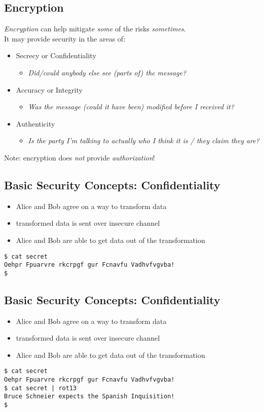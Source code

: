 \documentclass[xga]{xdvislides}
\begin{document}
\subsection{Encryption}
{\em Encryption} can help mitigate {\em some} of the risks {\em sometimes}.
\\

It may provide security in the areas of:
\begin{itemize}
	\item Secrecy or Confidentiality
		\begin{itemize}
			\item {\em Did/could anybody else see (parts of) the message?}
		\end{itemize}
	\item Accuracy or Integrity
		\begin{itemize}
			\item {\em Was the message (could it have been) modified before I received it?}
		\end{itemize}
	\item Authenticity
		\begin{itemize}
			\item {\em Is the party I'm talking to actually
who I think it is / they claim they are?}
		\end{itemize}
\end{itemize}
\vspace{.5in}
Note: encryption does {\em not} provide {\em authorization}!

\subsection{Basic Security Concepts: Confidentiality}
\begin{itemize}
	\item Alice and Bob agree on a way to transform data
	\item transformed data is sent over insecure channel
	\item Alice and Bob are able to get data out of the transformation
\end{itemize}
\addvspace{.5in}
\begin{verbatim}
$ cat secret
Oehpr Fpuarvre rkcrpgf gur Fcnavfu Vadhvfvgvba!
$
\end{verbatim}

\subsection{Basic Security Concepts: Confidentiality}
\begin{itemize}
	\item Alice and Bob agree on a way to transform data
	\item transformed data is sent over insecure channel
	\item Alice and Bob are able to get data out of the transformation
\end{itemize}
\addvspace{.5in}
\begin{verbatim}
$ cat secret
Oehpr Fpuarvre rkcrpgf gur Fcnavfu Vadhvfvgvba!
$ cat secret | rot13
Bruce Schneier expects the Spanish Inquisition!
$
\end{verbatim}
\end{document}
